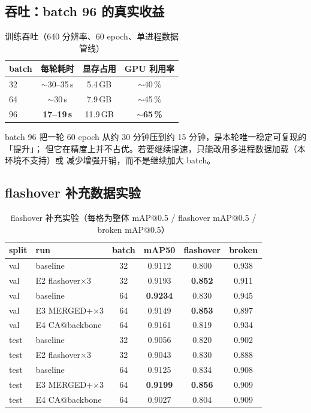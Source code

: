 \documentclass[UTF8,a4paper,11pt]{ctexart}
\begin{document}
\subsection{吞吐：batch 96 的真实收益}
\label{sec:speed}

\begin{table}[htbp]
\centering
\caption{训练吞吐（640 分辨率、60 epoch、单进程数据管线）}
\begin{tabular}{lccc}
\toprule
batch & 每轮耗时 & 显存占用 & GPU 利用率 \\
\midrule
32 & $\sim$30--35\,s & 5.4\,GB & $\sim$40\,\% \\
64 & $\sim$30\,s      & 7.9\,GB & $\sim$45\,\% \\
96 & \textbf{17--19\,s} & 11.9\,GB & \textbf{$\sim$65\,\%} \\
\bottomrule
\end{tabular}
\end{table}

batch 96 把一轮 60 epoch 从约 30 分钟压到约 15 分钟，是本轮唯一稳定可复现的「提升」；
但它在精度上并不占优。若要继续提速，只能改用多进程数据加载（本环境不支持）或
减少增强开销，而不是继续加大 batch。

\subsection{flashover 补充数据实验}

\begin{table}[htbp]
\centering
\caption{flashover 补充实验（每格为整体 mAP@0.5 / flashover mAP@0.5 / broken mAP@0.5）}
\label{tab:flash}
\begin{tabular}{llcccc}
\toprule
split & run & batch & mAP50 & flashover & broken \\
\midrule
val  & baseline            & 32 & 0.9112 & 0.800 & 0.938 \\
val  & E2 flashover$\times$3 & 32 & 0.9193 & \textbf{0.852} & 0.911 \\
val  & baseline            & 64 & \textbf{0.9234} & 0.830 & 0.945 \\
val  & E3 MERGED+$\times$3   & 64 & 0.9149 & \textbf{0.853} & 0.897 \\
val  & E4 CA@backbone      & 64 & 0.9161 & 0.819 & 0.934 \\
\midrule
test & baseline            & 32 & 0.9056 & 0.820 & 0.902 \\
test & E2 flashover$\times$3 & 32 & 0.9043 & 0.830 & 0.888 \\
test & baseline            & 64 & 0.9125 & 0.834 & 0.908 \\
test & E3 MERGED+$\times$3   & 64 & \textbf{0.9199} & \textbf{0.856} & 0.909 \\
test & E4 CA@backbone      & 64 & 0.9027 & 0.804 & 0.909 \\
\bottomrule
\end{tabular}
\end{table}
\end{document}
